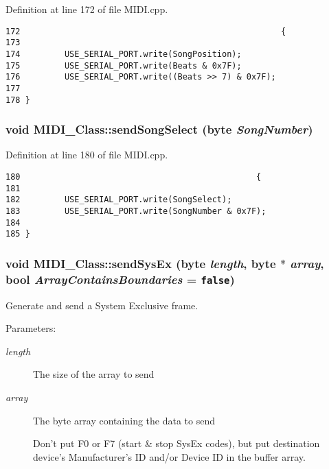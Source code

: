 Definition at line 172 of file MIDI.cpp.

\begin{Code}\begin{verbatim}172                                                     {
173         
174         USE_SERIAL_PORT.write(SongPosition);
175         USE_SERIAL_PORT.write(Beats & 0x7F);
176         USE_SERIAL_PORT.write((Beats >> 7) & 0x7F);
177         
178 }
\end{verbatim}
\end{Code}


\hypertarget{class_m_i_d_i___class_0b957074192d439e8e69af9eef6fab77}{
\subsubsection[{sendSongSelect}]{\setlength{\rightskip}{0pt plus 5cm}void MIDI\_\-Class::sendSongSelect (byte {\em SongNumber})}}
\label{class_m_i_d_i___class_0b957074192d439e8e69af9eef6fab77}




Definition at line 180 of file MIDI.cpp.

\begin{Code}\begin{verbatim}180                                                {
181         
182         USE_SERIAL_PORT.write(SongSelect);
183         USE_SERIAL_PORT.write(SongNumber & 0x7F);
184         
185 }
\end{verbatim}
\end{Code}


\hypertarget{class_m_i_d_i___class_73a36cacf4e77ca081979f9c7066ee28}{
\subsubsection[{sendSysEx}]{\setlength{\rightskip}{0pt plus 5cm}void MIDI\_\-Class::sendSysEx (byte {\em length}, \/  byte $\ast$ {\em array}, \/  bool {\em ArrayContainsBoundaries} = {\tt false})}}
\label{class_m_i_d_i___class_73a36cacf4e77ca081979f9c7066ee28}


Generate and send a System Exclusive frame. \begin{Desc}
\item[Parameters:]
\begin{description}
\item[{\em length}]The size of the array to send \item[{\em array}]The byte array containing the data to send\par
 Don't put F0 or F7 (start \& stop SysEx codes), but put destination device's Manufacturer's ID and/or Device ID in the buffer array. \end{description}
\end{Desc}


